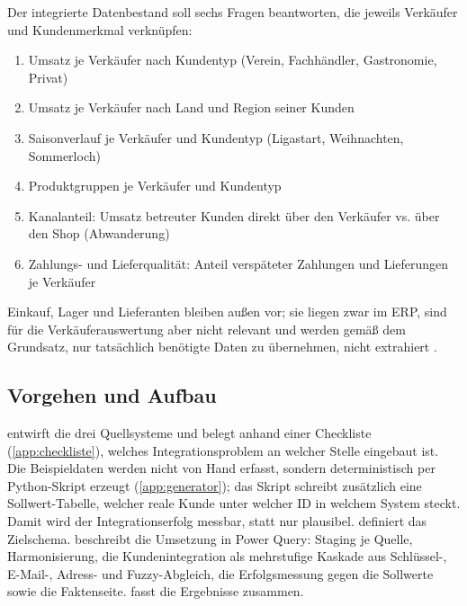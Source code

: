 Der integrierte Datenbestand soll sechs Fragen beantworten, die jeweils Verkäufer und Kundenmerkmal verknüpfen:
\begin{enumerate}[label=F\arabic*]
  \item Umsatz je Verkäufer nach Kundentyp (Verein, Fachhändler, Gastronomie, Privat)
  \item Umsatz je Verkäufer nach Land und Region seiner Kunden
  \item Saisonverlauf je Verkäufer und Kundentyp (Ligastart, Weihnachten, Sommerloch)
  \item Produktgruppen je Verkäufer und Kundentyp
  \item Kanalanteil: Umsatz betreuter Kunden direkt über den Verkäufer vs. über den Shop (Abwanderung)
  \item Zahlungs- und Lieferqualität: Anteil verspäteter Zahlungen und Lieferungen je Verkäufer
\end{enumerate}
Einkauf, Lager und Lieferanten bleiben außen vor; sie liegen zwar im ERP, sind für die Verkäuferauswertung aber nicht relevant und werden gemäß dem Grundsatz, nur tatsächlich benötigte Daten zu übernehmen, nicht extrahiert .

\subsection{Vorgehen und Aufbau}

 entwirft die drei Quellsysteme und belegt anhand einer Checkliste (\cref{app:checkliste}), welches Integrationsproblem an welcher Stelle eingebaut ist. Die Beispieldaten werden nicht von Hand erfasst, sondern deterministisch per Python-Skript erzeugt (\cref{app:generator}); das Skript schreibt zusätzlich eine Sollwert-Tabelle, welcher reale Kunde unter welcher ID in welchem System steckt. Damit wird der Integrationserfolg messbar, statt nur plausibel.  definiert das Zielschema.  beschreibt die Umsetzung in Power Query: Staging je Quelle, Harmonisierung, die Kundenintegration als mehrstufige Kaskade aus Schlüssel-, E-Mail-, Adress- und Fuzzy-Abgleich, die Erfolgsmessung gegen die Sollwerte sowie die Faktenseite.  fasst die Ergebnisse zusammen.

